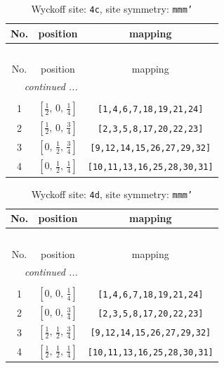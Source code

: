 \documentclass[fleqn,8pt]{jsarticle}
\begin{document}
\renewcommand{\arraystretch}{1.2}
\begin{longtable}{ccc}
\caption{Wyckoff site: {\tt 4c}, site symmetry: {\tt mmm'}}
 \\
 \hline \hline
No. & position & mapping \\ \hline \endfirsthead

\multicolumn{2}{l}{\tablename\ \thetable{}} \\
 \hline \hline
No. & position & mapping \\ \hline \endhead

 \hline \hline
\multicolumn{2}{r}{\footnotesize\it continued ...} \\ \endfoot

 \hline \hline
\multicolumn{2}{r}{} \\ \endlastfoot

1 & $\left[ \frac{1}{2},\, 0,\, \frac{1}{4} \right]$ & {\tt [1,4,6,7,18,19,21,24]} \\ \hline
2 & $\left[ \frac{1}{2},\, 0,\, \frac{3}{4} \right]$ & {\tt [2,3,5,8,17,20,22,23]} \\ \hline
3 & $\left[ 0,\, \frac{1}{2},\, \frac{3}{4} \right]$ & {\tt [9,12,14,15,26,27,29,32]} \\ \hline
4 & $\left[ 0,\, \frac{1}{2},\, \frac{1}{4} \right]$ & {\tt [10,11,13,16,25,28,30,31]} \\
\end{longtable}
\renewcommand{\arraystretch}{1.2}
\begin{longtable}{ccc}
\caption{Wyckoff site: {\tt 4d}, site symmetry: {\tt mmm'}}
 \\
 \hline \hline
No. & position & mapping \\ \hline \endfirsthead

\multicolumn{2}{l}{\tablename\ \thetable{}} \\
 \hline \hline
No. & position & mapping \\ \hline \endhead

 \hline \hline
\multicolumn{2}{r}{\footnotesize\it continued ...} \\ \endfoot

 \hline \hline
\multicolumn{2}{r}{} \\ \endlastfoot

1 & $\left[ 0,\, 0,\, \frac{1}{4} \right]$ & {\tt [1,4,6,7,18,19,21,24]} \\ \hline
2 & $\left[ 0,\, 0,\, \frac{3}{4} \right]$ & {\tt [2,3,5,8,17,20,22,23]} \\ \hline
3 & $\left[ \frac{1}{2},\, \frac{1}{2},\, \frac{3}{4} \right]$ & {\tt [9,12,14,15,26,27,29,32]} \\ \hline
4 & $\left[ \frac{1}{2},\, \frac{1}{2},\, \frac{1}{4} \right]$ & {\tt [10,11,13,16,25,28,30,31]} \\
\end{longtable}
\end{document}

